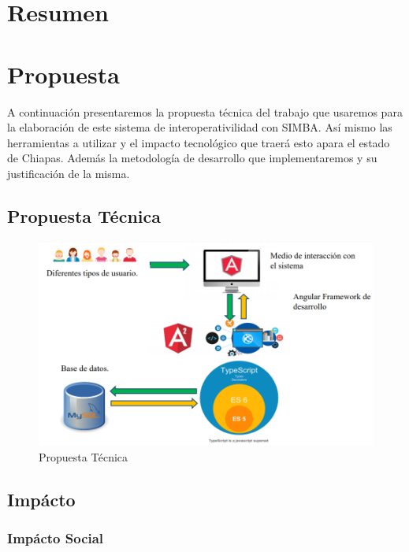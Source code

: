 \chapter*{Resumen}


\chapter{Propuesta} \label{sec:propuesta}

A continuación presentaremos la propuesta técnica del trabajo que usaremos para la elaboración de este sistema de interoperativilidad con SIMBA. Así mismo las herramientas a utilizar y el impacto tecnológico que traerá esto apara el estado de Chiapas. Además la metodología de desarrollo que implementaremos y su justificación de la misma.

\section{Propuesta Técnica}

\begin{figure}[h]
  \label{propuesta}
  \centering
  \includegraphics[scale=.4]{lib/assets/propuesta-tecnica}
  \caption{Propuesta Técnica}
\end{figure}


\section{Impácto}

\subsection{Impácto Social}

